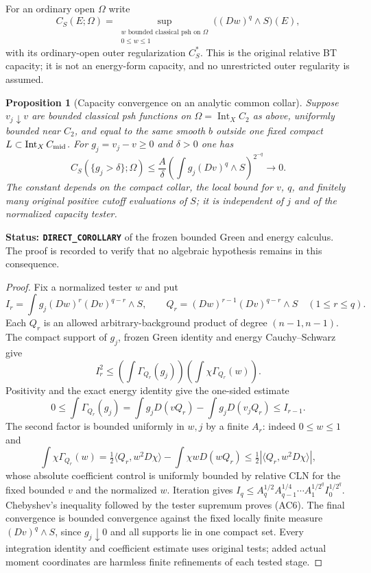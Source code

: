 \documentclass[11pt,a4paper]{article}
\numberwithin{equation}{section}
\newtheorem{proposition}[theorem]{Proposition}
\theoremstyle{definition}
\theoremstyle{remark}
\begin{document}
For an ordinary open $\Omega$ write
\[
 C_S(E;\Omega)=
 \sup_{\substack{w\text{ bounded classical psh on }\Omega\\0\le w\le1}}
                  \bigl((Dw)^q\wedge S\bigr)(E),
 \tag{AC5}
\]
with its ordinary-open outer regularization $C_S^*$.
This is the original relative BT capacity; it is not an energy-form
capacity, and no unrestricted outer regularity is assumed.

\begin{proposition}[Capacity convergence on an analytic common collar]
\label{prop:r11-analytic-collar-capacity}
Suppose $v_j\downarrow v$ are bounded classical psh functions on
$\Omega=\operatorname{Int}_X C_2$ as above, uniformly bounded near
$C_2$, and equal to the same smooth $b$ outside one fixed compact
$L\subset\operatorname{Int}_X C_{\rm mid}$.  For $g_j=v_j-v\ge0$
and $\delta>0$ one has
\[
 C_S(\{g_j>\delta\};\Omega)
   \le \frac{A}{\delta}
      \left(\int g_j(Dv)^q\wedge S\right)^{2^{-q}}
                       \longrightarrow0.
 \tag{AC6}
\]
The constant depends on the compact collar, the local bound for $v$,
$q$, and finitely many original positive cutoff evaluations of $S$;
it is independent of $j$ and of the normalized capacity tester.
\end{proposition}

\noindent\textbf{Status: \texttt{DIRECT\_COROLLARY}} of the frozen
bounded Green and energy calculus.  The proof is recorded to verify
that no algebraic hypothesis remains in this consequence.

\begin{proof}
Fix a normalized tester $w$ and put
\[
 I_r=\int g_j(Dw)^r(Dv)^{q-r}\wedge S,\qquad
 Q_r=(Dw)^{r-1}(Dv)^{q-r}\wedge S\quad(1\le r\le q).
\]
Each $Q_r$ is an allowed arbitrary-background product of degree
$(n-1,n-1)$.  The compact support of $g_j$, frozen Green identity
and energy Cauchy--Schwarz give
\[
 I_r^2\le \left(\int\Gamma_{Q_r}(g_j)\right)
                \left(\int\chi\Gamma_{Q_r}(w)\right).
\]
Positivity and the exact energy identity give the one-sided estimate
\[
 0\le\int\Gamma_{Q_r}(g_j)
     =\int g_jD(vQ_r)-\int g_jD(v_jQ_r)\le I_{r-1}.
\]
The second factor is bounded uniformly in $w,j$ by a finite $A_r$:
indeed $0\le w\le1$ and
\[
 \int\chi\Gamma_{Q_r}(w)
 =\tfrac12\langle Q_r,w^2D\chi\rangle
                         -\int\chi wD(wQ_r)
 \le\tfrac12|\langle Q_r,w^2D\chi\rangle|,
\]
whose absolute coefficient control is uniformly bounded by relative
CLN for the fixed bounded $v$ and the normalized $w$.
Iteration gives
$I_q\le A_q^{1/2}A_{q-1}^{1/4}\cdots A_1^{1/2^q}I_0^{1/2^q}$.
Chebyshev's inequality followed by the tester supremum proves (AC6).
The final convergence is bounded convergence against the fixed locally
finite measure $(Dv)^q\wedge S$, since $g_j\downarrow0$ and all
supports lie in one compact set.  Every integration identity and
coefficient estimate uses original tests; added actual moment
coordinates are harmless finite refinements of each tested stage.
\end{proof}
\end{document}
